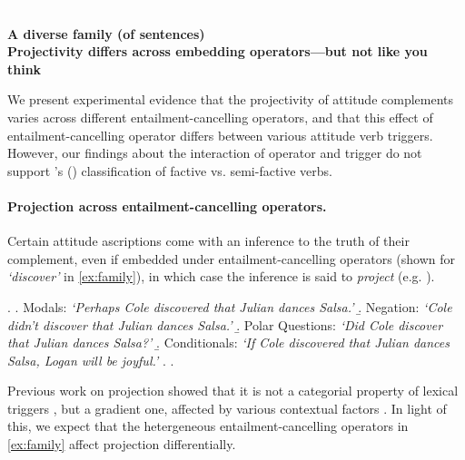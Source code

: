 \documentclass[12pt, a4paper]{scrartcl}
\newcommand{\posscite}[1]{\citeauthor{#1}'s (\citeyear{#1})}
\begin{document}

\textcolor{white}{.} \vspace{-3.9\baselineskip} \\
\begin{center}
	\textbf{\large%
		A diverse family (of sentences)\\ Projectivity differs across embedding operators---but not like you think}
\end{center}


\vspace{-.4\baselineskip}
\noindent We present experimental evidence that the projectivity of attitude complements varies across different entailment-cancelling operators, and that this effect of entailment-cancelling operator differs between various attitude verb triggers. However, our findings about the interaction of operator and trigger do not support \posscite{karttunen_observations_1971} classification of factive vs. semi-factive verbs.

\vspace{-\baselineskip}
\paragraph{Projection across entailment-cancelling operators.}  \hspace{-1em}
	Certain attitude ascriptions come with an inference to the truth of their complement, even if embedded under entailment-cancelling operators (shown for \emph{\lq discover\rq} in \ref{ex:family}), in which case the inference is said to \emph{project} (e.g. \citealp{karttunen_observations_1971}).

	\vspace{-.3\baselineskip}
	\ex. \label{ex:family}
		\a. \label{ex:mod}
			Modals: \hfill
			\emph{\lq Perhaps Cole discovered that Julian dances Salsa.\rq}
		\b. \label{ex:neg}
			Negation: \hfill
			\emph{\lq Cole didn't discover that Julian dances Salsa.\rq}
		\b. \label{ex:q}
			Polar Questions: \hfill
			\emph{\lq Did Cole discover that Julian dances Salsa?\rq}
		\b. \label{ex:cond}
			Conditionals: \hfill
			\emph{\lq If Cole discovered that Julian dances Salsa, Logan will be joyful.\rq}
		\z.
	\z.

	\vspace{-.4\baselineskip}
	Previous work on projection showed that it is not a categorial property of lexical triggers \citep{tonhauser_how_2018}, but a gradient one, affected by various contextual factors \citep{simons_what_2010,de_marneffe_did_2012,beaver_questions_2017,degen_prior_2021}. In light of this, we expect that the hetergeneous entailment-cancelling operators in \ref{ex:family} affect projection differentially.
\end{document}
